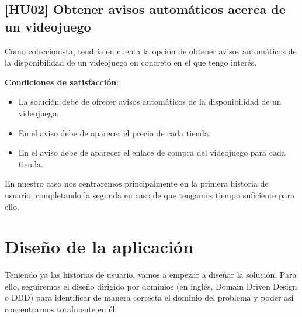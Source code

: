 \subsection{[HU02] Obtener avisos automáticos acerca de un videojuego}

Como coleccionista, tendría en cuenta la opción de obtener avisos automáticos de la 
disponibilidad de un videojuego en concreto en el que tengo interés.

\textbf{Condiciones de satisfacción}:

\begin{itemize}
    \item La solución debe de ofrecer avisos automáticos de la disponibilidad de un 
    videojuego.
    \item En el aviso debe de aparecer el precio de cada tienda.
    \item En el aviso debe de aparecer el enlace de compra del videojuego para 
    cada tienda.
\end{itemize}

En nuestro caso nos centraremos principalmente en la primera historia de usuario, 
completando la segunda en caso de que tengamos tiempo suficiente para ello.

\section{Diseño de la aplicación}

Teniendo ya las historias de usuario, vamos a empezar a diseñar la solución. Para 
ello, seguiremos el diseño dirigido por dominios (en inglés, Domain Driven Design o 
DDD) \cite{ddd} para identificar de manera correcta el dominio del problema y poder 
así concentrarnos totalmente en él.

